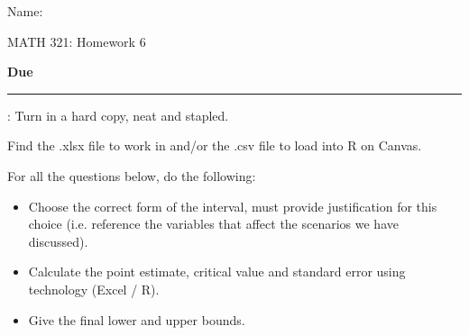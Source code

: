 \documentclass{article}
\newcommand{\blankul}[1]{\rule[-1.5mm]{#1}{0.15mm}}	%
\begin{document}
\hspace{375pt}Name:

\begin{center}
{\Huge MATH 321: Homework 6}
\end{center}

\bigskip\bigskip

{\large \textbf{Due} \blankul{4cm}: Turn in a hard copy, neat and stapled.}\bigskip


Find the .xlsx file to work in and/or the .csv file to load into R on Canvas.\bigskip

For all the questions below, do the following:\bigskip
\begin{itemize}
    \item Choose the correct form of the interval, must provide justification for this choice (i.e. reference the variables that affect the scenarios we have discussed).
    \item Calculate the point estimate, critical value and standard error using technology (Excel / R).
    \item Give the final lower and upper bounds.
\end{itemize}\bigskip
\end{document}
